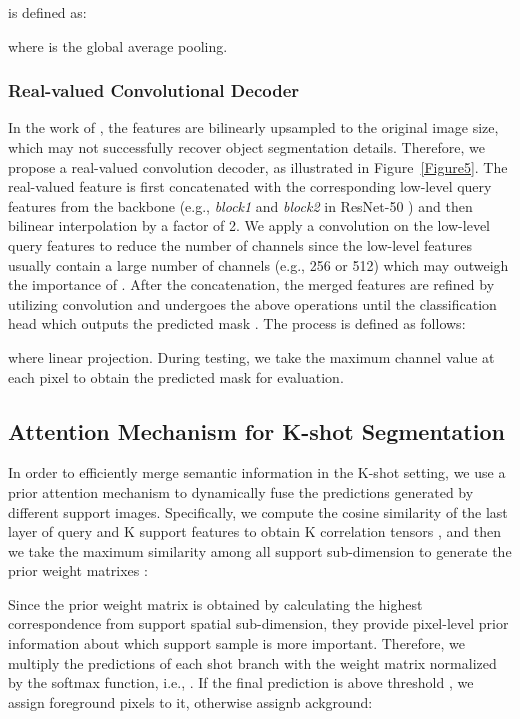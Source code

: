 \documentclass[lettersize,journal]{IEEEtran}
\begin{document}
 is defined as:

where  is the global average pooling.

\subsubsection{Real-valued Convolutional Decoder}

In the work of \cite{RN24, RN6, RN9}, the features are bilinearly upsampled to the original image size, which may not successfully recover object segmentation details. Therefore, we propose a real-valued convolution decoder, as illustrated in Figure~\ref{Figure5}. The real-valued feature  is first concatenated with the corresponding low-level query features \cite{RN73} from the backbone (e.g., \textit{block1} and \textit{block2} in ResNet-50\cite{RN5} ) and then bilinear interpolation by a factor of 2. We apply a  convolution on the low-level query features to reduce the number of channels since the low-level features usually contain a large number of channels (e.g., 256 or 512) which may outweigh the importance of . After the concatenation, the merged features are refined by utilizing  convolution and undergoes the above operations until the classification head which outputs the predicted mask . The process is defined as follows:

where  linear projection. During testing, we take the maximum channel value at each pixel to obtain the predicted mask  for evaluation.

\subsection{Attention Mechanism for K-shot Segmentation}\label{4.8}
In order to efficiently merge semantic information in the K-shot setting, we use a prior attention mechanism to dynamically fuse the predictions generated by different support images. Specifically, we compute the cosine similarity of the last layer of query and K support features to obtain K correlation tensors , and then we take the maximum similarity among all support sub-dimension to generate the prior weight matrixes :


Since the prior weight matrix is obtained by calculating the highest correspondence from support spatial sub-dimension, they provide pixel-level prior information about which support sample is more important. Therefore, we multiply the predictions of each shot branch with the weight matrix normalized by the softmax function, i.e., . If the final prediction is above threshold  , we assign foreground pixels to it, otherwise assignb ackground:
\end{document}
